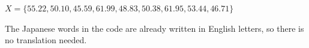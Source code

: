 \begin{tcolorbox}
	$X = \{ 55.22, 50.10, 45.59, 61.99, 48.83, 50.38, 61.95, 53.44, 46.71\}$
\end{tcolorbox}

The Japanese words in the code are already written in English letters, so there is no translation needed.
